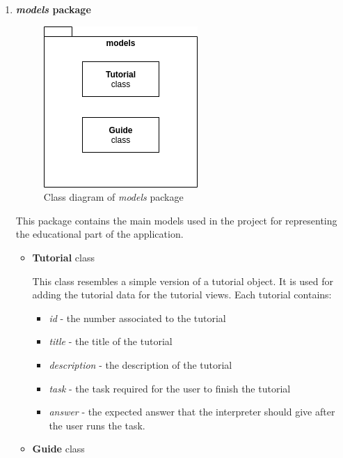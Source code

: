 \documentclass[12pt,a4paper,twoside]{report}
\begin{document}
\begin{enumerate}
 \item \textbf{\textit{models} package}
 
 \begin{figure}[h]
 \centering
 \includegraphics[scale=0.4]{img/ModelsPackage.png}
 \caption{Class diagram of \textit{models} package}
\end{figure}

This package contains the main models used in the project for representing the educational part of the application.  
\begin{itemize}
 \item \textbf{Tutorial} class
    
    This class resembles a simple version of a tutorial object. It is used for adding the tutorial data for the tutorial views. Each tutorial contains:
    \begin{itemize}
        \item \textit{id} - the number associated to the tutorial
        \item \textit{title} - the title of the tutorial
        \item \textit{description} - the description of the tutorial
        \item \textit{task} - the task required for the user to finish the tutorial
        \item \textit{answer} - the expected answer that the interpreter should give after the user runs the task.
    \end{itemize}
    
    \item \textbf{Guide} class
    

\end{itemize}
\end{enumerate}
\end{document}
